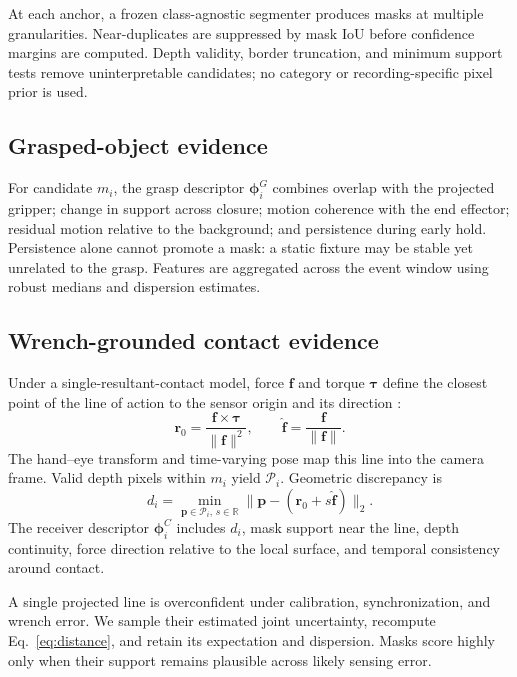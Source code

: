 \documentclass[letterpaper,10pt,journal,twoside]{IEEEtran}
\begin{document}
At each anchor, a frozen class-agnostic segmenter produces masks at multiple
granularities. Near-duplicates are suppressed by mask IoU before confidence
margins are computed. Depth validity, border truncation, and minimum support
tests remove uninterpretable candidates; no category or recording-specific
pixel prior is used.

\subsection{Grasped-object evidence}

For candidate $m_i$, the grasp descriptor $\boldsymbol{\phi}^{G}_i$ combines
overlap with the projected gripper; change in support across closure; motion
coherence with the end effector; residual motion relative to the background;
and persistence during early hold. Persistence alone cannot promote a mask: a
static fixture may be stable yet unrelated to the grasp. Features are aggregated
across the event window using robust medians and dispersion estimates.

\subsection{Wrench-grounded contact evidence}

Under a single-resultant-contact model, force $\mathbf{f}$ and torque
$\boldsymbol{\tau}$ define the closest point of the line of action to the sensor
origin and its direction \cite{bicchi1990}:
\begin{equation}
\mathbf{r}_0=\frac{\mathbf{f}\times\boldsymbol{\tau}}
{\lVert\mathbf{f}\rVert^2},\qquad
\hat{\mathbf{f}}=\frac{\mathbf{f}}{\lVert\mathbf{f}\rVert}.
\label{eq:line}
\end{equation}
The hand--eye transform and time-varying pose map this line into the camera
frame. Valid depth pixels within $m_i$ yield $\mathcal{P}_i$. Geometric
discrepancy is
\begin{equation}
d_i=\min_{\mathbf{p}\in\mathcal{P}_i,\,s\in\mathbb{R}}
\|\mathbf{p}-(\mathbf{r}_0+s\hat{\mathbf{f}})\|_2.
\label{eq:distance}
\end{equation}
The receiver descriptor $\boldsymbol{\phi}^{C}_i$ includes $d_i$, mask support
near the line, depth continuity, force direction relative to the local surface,
and temporal consistency around contact.

A single projected line is overconfident under calibration, synchronization,
and wrench error. We sample their estimated joint uncertainty, recompute
Eq.~\eqref{eq:distance}, and retain its expectation and dispersion. Masks score
highly only when their support remains plausible across likely sensing error.
\end{document}
